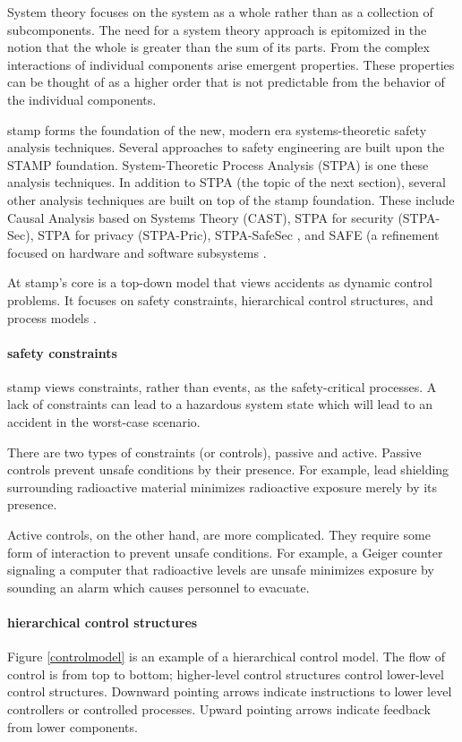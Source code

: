 \documentclass[../../main/main.tex]{subfiles}
\begin{document}
System theory focuses on the system as a whole rather than as a collection of subcomponents.  The need for a system theory approach is epitomized in the notion that the whole is greater than the sum of its parts.  From the complex interactions of individual components arise emergent properties. These properties can be thought of as a higher order that is not predictable from the behavior of the individual components.

\gls{stamp} forms the foundation of the new, modern era systems-theoretic safety analysis techniques.  Several approaches to safety engineering are built upon the STAMP foundation.  System-Theoretic Process Analysis (STPA) is one these analysis techniques.  In addition to STPA (the topic of the next section), several other analysis techniques are built on top of the \gls{stamp} foundation.  These include Causal Analysis based on Systems Theory (CAST), STPA for security (STPA-Sec), STPA for privacy (STPA-Pric), STPA-SafeSec \cite{safe}, and SAFE (a refinement focused on hardware and software subsystems \cite{safe)}.

 At \gls{stamp}'s core is a top-down model that views accidents as dynamic control problems.  It focuses on safety constraints, hierarchical control structures, and process models \cite{saferworld}. 

\paragraph*{safety constraints}
\gls{stamp} views constraints, rather than events, as the safety-critical processes.  A lack of constraints can lead to a hazardous system state which will lead to an accident in the worst-case scenario.  

There are two types of constraints (or controls), passive and active.  Passive controls prevent unsafe conditions by their presence.  For example, lead shielding surrounding radioactive material minimizes radioactive exposure merely by its presence.  

Active controls, on the other hand, are more complicated.  They require some form of interaction to prevent unsafe conditions.  For example, a Geiger counter signaling a computer that radioactive levels are unsafe minimizes exposure by sounding an alarm which causes personnel to evacuate.  

\paragraph*{hierarchical control structures}
Figure \ref{controlmodel} is an example of a hierarchical control model.  The flow of control is from top to bottom; higher-level control structures control lower-level control structures. Downward pointing arrows indicate instructions to lower level controllers or controlled processes.  Upward pointing arrows indicate feedback from lower components.   
\end{document}
